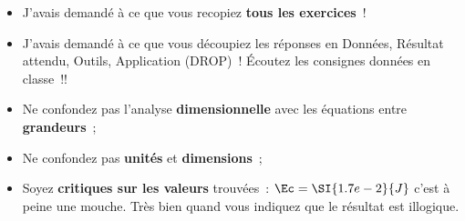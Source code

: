 \documentclass[a4paper, 11pt, final, garamond]{book}
\begin{document}
\begin{itemize}
	\item J'avais demandé à ce que vous recopiez \textbf{tous les exercices}~!
	\item J'avais demandé à ce que vous découpiez les réponses en Données,
	      Résultat attendu, Outils, Application (DROP)~! Écoutez les consignes données
	      en classe~!!
	\item Ne confondez pas l'analyse \textbf{dimensionnelle} avec les équations
	      entre \textbf{grandeurs}~;
	\item Ne confondez pas \textbf{unités} et \textbf{dimensions}~;
	\item Soyez \textbf{critiques sur les valeurs} trouvées~: $\Ec =
		      \SI{1.7e-2}{J}$ c'est à peine une mouche. Très bien quand vous
	      indiquez que le résultat est illogique.
\end{itemize}
\end{document}
